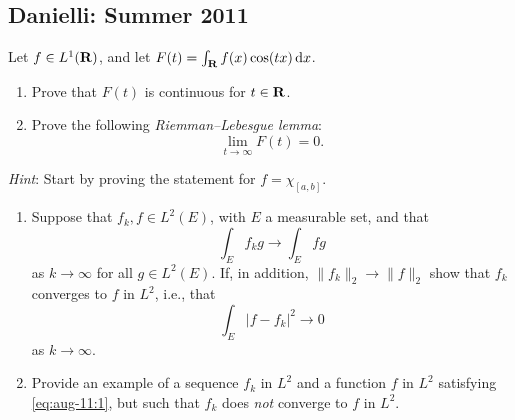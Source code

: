 \subsection{Danielli: Summer 2011}
\setcounter{exercise}{0}
\setcounter{equation}{0}

\begin{problem}
  Let \(f\in L^1(\mathbf{R})\), and let \(F(t)=\int_{\mathbf{R}} f(x)\cos(tx)\mathop{}\!\mathrm{d} x\).
\begin{enumerate}[label=(\alph*),noitemsep]
\item Prove that \(F(t)\) is continuous for \(t\in\mathbf{R}\).
\item Prove the following \emph{Riemman--Lebesgue lemma}:
\[
\lim_{t\to\infty}F(t)=0.
\]
\end{enumerate}
\emph{Hint}: Start by proving the statement for \(f=\chi_{[a,b]}\).
\end{problem}
\begin{solution}

\end{solution}

\begin{problem}
\begin{enumerate}[label=(\alph*),noitemsep]
\item Suppose that \(f_k,f\in L^2(E)\), with \(E\) a measurable set, and
  that
\begin{equation}
\label{eq:aug-11:1}
\int_E f_kg\longrightarrow\int_E fg
\end{equation}
as \(k\to\infty\) for all \(g\in L^2(E)\). If, in addition,
\(\|f_k\|_2\to\|f\|_2\) show that \(f_k\) converges to \(f\) in \(L^2\),
i.e., that
\[
\int_E|f-f_k|^2\longrightarrow 0
\]
as \(k\to\infty\).
\item Provide an example of a sequence \(f_k\) in \(L^2\) and a function
  \(f\) in \(L^2\) satisfying \eqref{eq:aug-11:1}, but such that \(f_k\)
  does \emph{not} converge to \(f\) in \(L^2\).
\end{enumerate}
\end{problem}
\begin{solution}
\end{solution}

